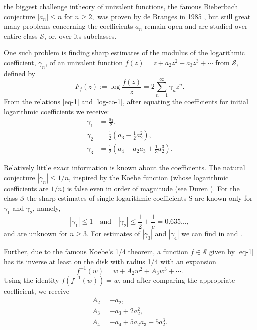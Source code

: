 \documentclass{amsart}
\newcommand{\es}{{\mathcal S}}
\def\be{\begin{equation}}
\def\ee{\end{equation}}
\begin{document}
\medskip

the biggest challenge intheory of univalent functions, the famous Bieberbach conjecture $|a_n|\le n$ for $n\ge2,$ was proven by de Branges in 1985 \cite{Bra85}, but still great many problems concerning the coefficients $a_n$ remain open and are studied over entire class $\es$, or, over its subclasses.

\medskip

One such problem is finding sharp estimates of the modulus of the logarithmic coefficient, $\gamma_n$, of an univalent function $f(z)=z+a_2z^2+a_3z^3+\cdots$ from $\es$,  defined by
  \be\label{log-co-1}
  F_f(z) := \log\frac{f(z)}{z}=2\sum_{n=1}^\infty \gamma_n z^n.
  \ee
From the relations \eqref{eq-1} and \eqref{log-co-1}, after  equating the coefficients for initial logarithmic coefficients we receive:
\begin{equation}\label{eq-3}
\begin{split}
 \gamma_{1}&=\frac{a_{2}}{2},\\
 \gamma_{2}&=\frac{1}{2}\left(a_3-\frac{1}{2}a_{2}^{2}\right), \\
 \gamma_{3}&=\frac{1}{2}\left(a_4-a_2a_3+\frac13a_2^3\right).
\end{split}
\end{equation}

\medskip

Relatively little exact information is known about the coefficients. The natural conjecture $|\gamma_n|\le1/n$, inspired by the Koebe function (whose logarithmic coefficients are $1/n$) is false even in order of magnitude (see Duren \cite[Section 8.1]{duren}).
For the class $\es$ the sharp estimates of single logarithmic coefficients S are known only for $\gamma_1$ and $\gamma_2$, namely,
\[|\gamma_1|\le1\quad\mbox{and}\quad |\gamma_2|\le \frac12+\frac1e=0.635\ldots,\]
and are unknown for $n\ge3$. For estimates of $|\gamma_{3}|$ and $|\gamma_{4}|$ we can find in \cite{106} and \cite{114}.

\medskip

Further, due to the famous Koebe's 1/4 theorem, a function $f\in\es$ given by \eqref{eq-1} has its inverse at least on the disk with radius 1/4 with an expansion
\begin{equation}\label{eq-4}
f^{-1}(w) = w+A_2w^2+A_3w^3+\cdots.
\end{equation}
Using the identity $f(f^{-1}(w))=w$, and after comparing the appropriate coefficient, we receive
\begin{equation}\label{eq-5}
\begin{array}{l}
A_{2}=-a_{2}, \\
A _{3}=-a_{3}+2a_{2}^{2} , \\
A_{4}= -a_{4}+5a_{2}a_{3}-5a_{2}^{3}.
\end{array}
\end{equation}
\end{document}
